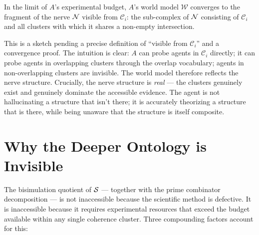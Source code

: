 \begin{proposition}
\label{prop:false-ontology}
In the limit of $A$'s experimental budget, $A$'s world model
$\mathcal{W}$ converges to the fragment of the nerve $\mathcal{N}$
visible from $\mathcal{C}_i$: the sub-complex of $\mathcal{N}$
consisting of $\mathcal{C}_i$ and all clusters with which it shares
a non-empty intersection.
\end{proposition}

\begin{remark}
This is a sketch pending a precise definition of ``visible from
$\mathcal{C}_i$'' and a convergence proof.
The intuition is clear: $A$ can probe agents in $\mathcal{C}_i$
directly; it can probe agents in overlapping clusters through the
overlap vocabulary; agents in non-overlapping clusters are invisible.
The world model therefore reflects the nerve structure.
Crucially, the nerve structure is \emph{real} --- the clusters
genuinely exist and genuinely dominate the accessible evidence.
The agent is not hallucinating a structure that isn't there; it is
accurately theorizing a structure that is there, while being
unaware that the structure is itself composite.
\end{remark}

\section{Why the Deeper Ontology is Invisible}

The bisimulation quotient of $\mathcal{S}$ --- together with the prime
combinator decomposition --- is not inaccessible because the
scientific method is defective.
It is inaccessible because it requires experimental resources that
exceed the budget available within any single coherence cluster.
Three compounding factors account for this:

